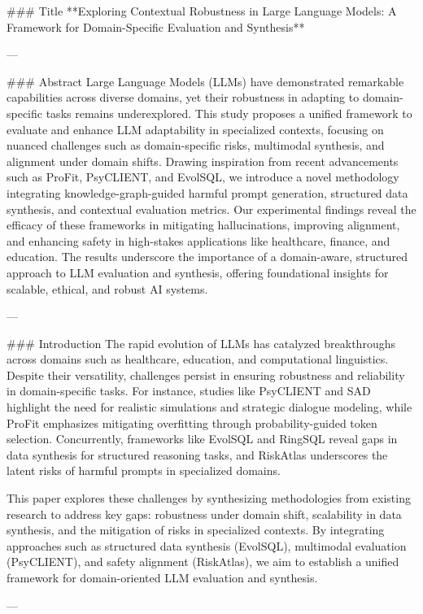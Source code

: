 ### Title
**Exploring Contextual Robustness in Large Language Models: A Framework for Domain-Specific Evaluation and Synthesis**

---

### Abstract
Large Language Models (LLMs) have demonstrated remarkable capabilities across diverse domains, yet their robustness in adapting to domain-specific tasks remains underexplored. This study proposes a unified framework to evaluate and enhance LLM adaptability in specialized contexts, focusing on nuanced challenges such as domain-specific risks, multimodal synthesis, and alignment under domain shifts. Drawing inspiration from recent advancements such as ProFit, PsyCLIENT, and EvolSQL, we introduce a novel methodology integrating knowledge-graph-guided harmful prompt generation, structured data synthesis, and contextual evaluation metrics. Our experimental findings reveal the efficacy of these frameworks in mitigating hallucinations, improving alignment, and enhancing safety in high-stakes applications like healthcare, finance, and education. The results underscore the importance of a domain-aware, structured approach to LLM evaluation and synthesis, offering foundational insights for scalable, ethical, and robust AI systems.

---

### Introduction
The rapid evolution of LLMs has catalyzed breakthroughs across domains such as healthcare, education, and computational linguistics. Despite their versatility, challenges persist in ensuring robustness and reliability in domain-specific tasks. For instance, studies like PsyCLIENT and SAD highlight the need for realistic simulations and strategic dialogue modeling, while ProFit emphasizes mitigating overfitting through probability-guided token selection. Concurrently, frameworks like EvolSQL and RingSQL reveal gaps in data synthesis for structured reasoning tasks, and RiskAtlas underscores the latent risks of harmful prompts in specialized domains.

This paper explores these challenges by synthesizing methodologies from existing research to address key gaps: robustness under domain shift, scalability in data synthesis, and the mitigation of risks in specialized contexts. By integrating approaches such as structured data synthesis (EvolSQL), multimodal evaluation (PsyCLIENT), and safety alignment (RiskAtlas), we aim to establish a unified framework for domain-oriented LLM evaluation and synthesis.

---

